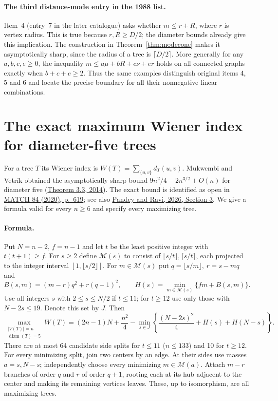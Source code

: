\documentclass[11pt,a4paper]{article}
\begin{document}
\paragraph{The third distance-mode entry in the 1988 list.}
Item~4 (entry~7 in the later catalogue) asks whether $m\le r+R$, where $r$ is vertex radius. This is true because $r,R\ge D/2$; the diameter bounds already give this implication. The construction in Theorem~\ref{thm:modecone} makes it asymptotically sharp, since the radius of a tree is $\lceil D/2\rceil$. More generally for any $a,b,c,e\ge0$, the inequality $m\le a\mu+bR+c\nu+er$ holds on all connected graphs exactly when $b+c+e\ge2$. Thus the same examples distinguish original items 4, 5 and 6 and locate the precise boundary for all their nonnegative linear combinations.

\section{The exact maximum Wiener index for diameter-five trees}
\label{sec:diamfive}
For a tree \(T\) its Wiener index is \(W(T)=\sum_{\{u,v\}}d_T(u,v)\).
Mukwembi and Vetrík obtained the asymptotically sharp bound
\(9n^2/4-2n^{3/2}+O(n)\) for diameter five
(\href{https://doi.org/10.1017/S0004972713000816}{Theorem 3.3, 2014}).
The exact bound is identified as open in
\href{https://match.pmf.kg.ac.rs/electronic_versions/Match84/n3/match84n3_611-628.pdf}
{MATCH 84 (2020), p.~619}; see also
\href{https://arxiv.org/abs/2605.24855}{Pandey and Ravi, 2026, Section 3}.
We give a formula valid for every \(n\ge6\) and specify every maximizing tree.

\paragraph{Formula.}
Put \(N=n-2\), \(f=n-1\) and let \(t\) be the least positive integer
with \(t(t+1)\ge f\). For \(s\ge2\) define \(\mathcal M(s)\) to consist
of \(\lfloor s/t\rfloor,\lceil s/t\rceil\), each projected to the
integer interval \([1,\lfloor s/2\rfloor]\). For \(m\in\mathcal M(s)\)
put \(q=\lfloor s/m\rfloor,\ r=s-mq\) and
\[
 B(s,m)=(m-r)q^2+r(q+1)^2,\qquad
 H(s)=\min_{m\in\mathcal M(s)}\{fm+B(s,m)\}.
\]
Use all integers \(s\) with \(2\le s\le N/2\) if \(t\le11\); for
\(t\ge12\) use only those with \(N-2s\le19\). Denote this set by \(J\).
Then
\[
 \max_{\substack{|V(T)|=n\\ \operatorname{diam}(T)=5}}W(T)
  =(2n-1)N+\frac{n^2}{4}
    -\min_{s\in J}
         \left\{ \frac{(N-2s)^2}{4}+H(s)+H(N-s)\right\}.
\]
There are at most 64 candidate side splits for \(t\le11\)
(\(n\le133\)) and 10 for \(t\ge12\).
For every minimizing split, join two centers by an edge. At their sides
use masses \(a=s,N-s\); independently choose every minimizing
\(m\in\mathcal M(a)\). Attach \(m-r\) branches of order \(q\) and \(r\)
of order \(q+1\), rooting each at its hub adjacent to the center and
making its remaining vertices leaves. These, up to isomorphism, are
all maximizing trees.
\end{document}
